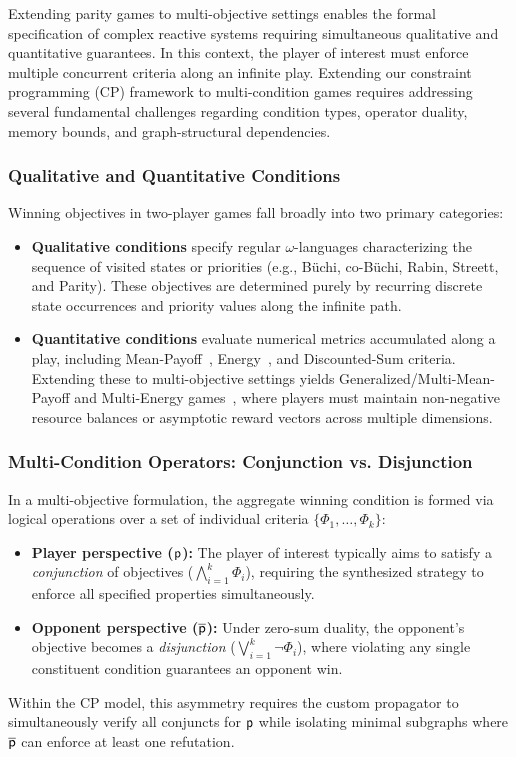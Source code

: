 \documentclass{article}
\begin{document}
Extending parity games to multi-objective settings enables the formal specification of complex reactive systems requiring simultaneous qualitative and quantitative guarantees. In this context, the player of interest must enforce multiple concurrent criteria along an infinite play. Extending our constraint programming (CP) framework to multi-condition games requires addressing several fundamental challenges regarding condition types, operator duality, memory bounds, and graph-structural dependencies.

\subsubsection{Qualitative and Quantitative Conditions}
Winning objectives in two-player games fall broadly into two primary categories:
\begin{itemize}
    \item \textbf{Qualitative conditions} specify regular $\omega$-languages characterizing the sequence of visited states or priorities (e.g., Büchi, co-Büchi, Rabin, Streett, and Parity). These objectives are determined purely by recurring discrete state occurrences and priority values along the infinite path.
    \item \textbf{Quantitative conditions} evaluate numerical metrics accumulated along a play, including Mean-Payoff~\cite{Daviaud:2018}, Energy~\cite{Chatterjee:2010EP}, and Discounted-Sum criteria. Extending these to multi-objective settings yields Generalized/Multi-Mean-Payoff and Multi-Energy games~\cite{Chatterjee:2010:GMaE,Velner:2015}, where players must maintain non-negative resource balances or asymptotic reward vectors across multiple dimensions.
\end{itemize}

\subsubsection{Multi-Condition Operators: Conjunction vs. Disjunction}
In a multi-objective formulation, the aggregate winning condition is formed via logical operations over a set of individual criteria $\{\Phi_1, \dots, \Phi_k\}$:
\begin{itemize}
    \item \textbf{Player perspective ($\mathsf{p}$):} The player of interest typically aims to satisfy a \textit{conjunction} of objectives ($\bigwedge_{i=1}^k \Phi_i$), requiring the synthesized strategy to enforce all specified properties simultaneously.
    \item \textbf{Opponent perspective ($\overline{\mathsf{p}}$):} Under zero-sum duality, the opponent's objective becomes a \textit{disjunction} ($\bigvee_{i=1}^k \neg\Phi_i$), where violating any single constituent condition guarantees an opponent win.
\end{itemize}
Within the CP model, this asymmetry requires the custom propagator to simultaneously verify all conjuncts for $\mathsf{p}$ while isolating minimal subgraphs where $\overline{\mathsf{p}}$ can enforce at least one refutation.
\end{document}
